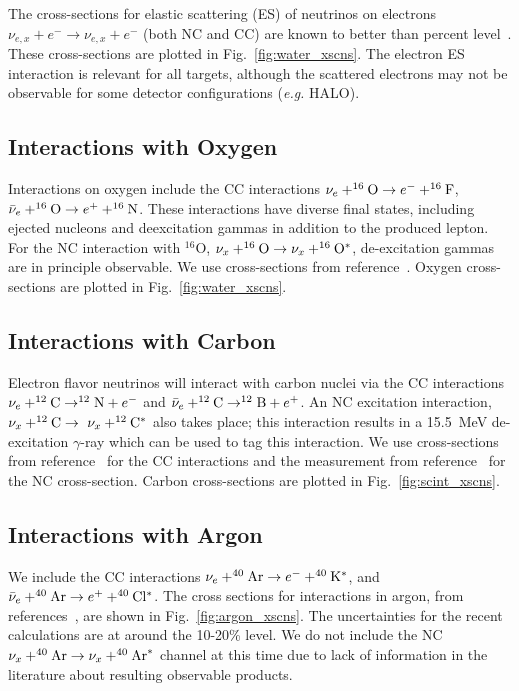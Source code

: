 \documentclass[12pt]{article}
\begin{document}
The cross-sections for elastic scattering (ES) of
neutrinos on electrons $\nu_{e,x} + e^- \rightarrow \nu_{e,x} + e^-$
 (both NC and CC) are known to better than percent level~\cite{Marciano:2003eq}.
These cross-sections are plotted in Fig.~\ref{fig:water_xscns}.
The electron ES interaction is relevant for all targets, although the scattered
electrons may not be observable for some detector configurations
(\textit{e.g.} HALO).


\subsection{Interactions with Oxygen}

Interactions on oxygen include the CC interactions $\nu_e+^{16}{\rm
  O}\rightarrow e^-+^{16}{\rm F}$, $\bar{\nu}_e+^{16}{\rm O}
\rightarrow e^++^{16}{\rm N}$.  
These interactions have diverse final states, including
ejected nucleons and deexcitation gammas in addition to the produced
lepton.  For the NC interaction with $^{16}$O, $\nu_x+^{16}{\rm O}
\rightarrow \nu_x+ ^{16}{\rm O}^*$, de-excitation gammas are in principle
observable.  We use cross-sections from reference~\cite{Kolbe:2002gk}.
Oxygen cross-sections are plotted in Fig.~\ref{fig:water_xscns}.

\subsection{Interactions with Carbon}

Electron flavor neutrinos will interact with carbon nuclei via the CC
interactions $\nu_e+^{12}{\rm C}\rightarrow^{12}{\rm N}+e^-$ and
$\bar{\nu}_e +^{12}{\rm C}\rightarrow ^{12}{\rm B}+e^+$. An NC
excitation interaction, $\nu_x+^{12}{\rm C}\rightarrow~\nu_x+^{12}{\rm
  C}^{*}$ also takes place; this interaction results in a 15.5~MeV
de-excitation $\gamma$-ray which can be used to tag this interaction.
We use cross-sections from reference~\cite{Kolbe:1999au} for the CC interactions and the measurement from reference~\cite{Armbruster:1998gk} for the NC cross-section.
Carbon cross-sections are plotted in Fig.~\ref{fig:scint_xscns}.



\subsection{Interactions with Argon}

We include the CC interactions
$\nu_e + ^{40}{\rm Ar} \rightarrow e^- + ^{40}{\rm K^*}$, and
$\bar{\nu}_e + ^{40}{\rm Ar} \rightarrow e^+ + ^{40}{\rm Cl^*}$.
The cross sections for interactions in argon, from references~\cite{GilBotella:2004bv,Kolbe:2003ys},
are shown in Fig.~\ref{fig:argon_xscns}.   The uncertainties for the recent calculations 
are at around the 10-20\% level.
We do not include the NC
$\nu_x + ^{40}{\rm Ar} \rightarrow \nu_x+ ^{40}{\rm Ar}^*$ channel at this time
due to lack of information in the literature about resulting observable products.
\end{document}

